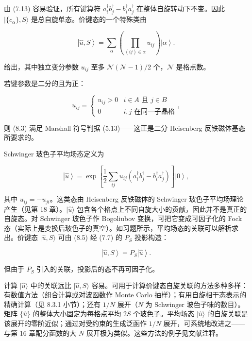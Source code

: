 由 (7.13) 容易验证，所有键算符 $a_i^\dagger b_j^\dagger - b_i^\dagger a_j^\dagger$ 在整体自旋转动下不变。因此 $|\{c_\alpha\}, S\rangle$ 是总自旋单态。价键态的一个特殊类由

\begin{equation*}
\left| \hat {u}, S \right\rangle = \sum_ {\alpha} \left( \prod_ {(ij) \in \alpha} u _ {ij} \right) \left| \alpha \right\rangle .
\tag{8.3}
\end{equation*}

给出，其中独立变分参数 $u_{ij}$ 至多 $\mathcal{N}(\mathcal{N}-1)/2$ 个，$\mathcal{N}$ 是格点数。

若键参数是二分的且为正：

\begin{equation*}
u _ {ij} = \left\{ \begin{array}{ll} u _ {ij} > 0 & i \in A \text{ 且 } j \in B \\ 0 & i, j \text{ 在同一子晶格} \end{array} \right. ,
\tag{8.4}
\end{equation*}

则 (8.3) 满足 Marshall 符号判据 (5.13)——这正是二分 Heisenberg 反铁磁体基态所要求的。

Schwinger 玻色子平均场态定义为

\begin{equation*}
\left| \hat {u} \right\rangle = \exp \left[ \frac {1}{2} \sum_ {ij} u _ {ij} \left( a _ {i} ^ {\dagger} b _ {j} ^ {\dagger} - b _ {i} ^ {\dagger} a _ {j} ^ {\dagger} \right) \right] \left| 0 \right\rangle ,
\tag{8.5}
\end{equation*}

其中 $u_{ij} = -u_{ji}$。这类态由 Heisenberg 反铁磁体的 Schwinger 玻色子平均场理论产生（见第 18 章）。$|\hat{u}\rangle$ 包含各个格点上不同自旋大小的贡献，因此并不是真正的自旋态。对 Schwinger 玻色子作 Bogoliubov 变换，可把它变成可因子化的 Fock 态（实际上是变换后玻色子的真空）。如习题所示，平均场态的关联可以解析求出。价键态 $|\hat{u}, S\rangle$ 可由 (8.5) 经 (7.7) 的 $P_{S}$ 投影构造：

\begin{equation*}
\left| \hat {u}, S \right\rangle = P _ {S} \left| \hat {u} \right\rangle .
\tag{8.6}
\end{equation*}

但由于 $P_{S}$ 引入的关联，投影后的态不再可因子化。

计算 $|\hat{u}\rangle$ 中的关联远比 $|\hat{u}, S\rangle$ 容易。可用于计算价键态自旋关联的方法多种多样：有数值方法（组合计算或对波函数作 Monte Carlo 抽样）；有用自旋相干态表示的精确计算（见 8.3.1 小节）；还有 $1/N$ 展开（$N$ 为 Schwinger 玻色子味的数目）。矩阵 $\{\hat{u}\}$ 的整体大小固定为每格点平均 $2S$ 个玻色子。平均场态 $|\hat{u}\rangle$ 的自旋关联是该展开的零阶近似；通过对受约束的生成泛函作 $1/N$ 展开，可系统地改进之——与第 16 章配分函数的大 $N$ 展开极为类似。这些方法的例子见文献注释。

